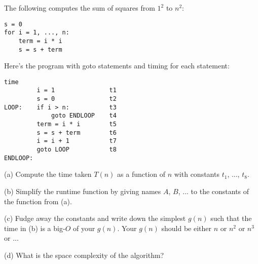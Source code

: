 The following computes the sum of squares from $1^2$ to $n^2$:
\begin{Verbatim}[frame=single, fontsize=\small]
s = 0
for i = 1, ..., n:
    term = i * i
    s = s + term
\end{Verbatim}
Here's the program with goto statements and timing for each statement:
\begin{Verbatim}[frame=single, fontsize=\small]
                             time
         i = 1               t1
         s = 0               t2
LOOP:    if i > n:           t3
             goto ENDLOOP    t4
         term = i * i        t5
         s = s + term        t6
         i = i + 1           t7
         goto LOOP           t8
ENDLOOP:
\end{Verbatim}
(a) Compute the time taken $T(n)$ as a function of $n$
with constants $t_1$, ..., $t_8$.

(b) Simplify the runtime function by giving names $A$, $B$, ...
to the constants of the function from (a).

(c) Fudge away the constants and write down the simplest $g(n)$ such 
that the time in (b) is a big-$O$ of your $g(n)$.
Your $g(n)$ should be either $n$ or $n^2$ or $n^3$ or ...

(d) What is the space complexity of the algorithm?
